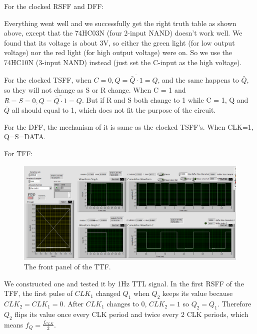 \documentclass[11pt]{article}
\begin{document}
For the clocked RSFF and DFF:

Everything went well and we successfully get the right truth table as shown above, except that the 74HC03N (four 2-input NAND) doesn't work well. We found that its voltage is about 3V, so either the green light (for low output voltage) nor the red light (for high output voltage) were on. So we use the 74HC10N (3-input NAND) instead (just set the C-input as the high voltage).

\vbox{}

For the clocked TSFF, when $C = 0, Q =\overline{\bar{Q}\cdot 1} = Q$, and the same happens to $\bar{Q}$, so they will not change as S or R change. When C = 1 and $R = S = 0, Q = \overline{\bar{Q}\cdot1} = Q$. But if R and S both change to 1 while C = 1, Q and $\bar{Q}$ all should equal to 1, which does not fit the purpose of the circuit.

\vbox{}

For the DFF, the mechanism of it is same as the clocked TSFF's. When CLK=1, Q=S=DATA.

\vbox{}

For TFF:


\begin{figure}[H]
 \begin{center}
  \includegraphics[width=\linewidth/1]{act4_3}
  \caption{The front panel of the TTF.}
  \label{fig:act4_3}
 \end{center}
\end{figure}

We constructed one and tested it by 1Hz TTL signal. In the first RSFF of the TFF, the first pulse of $CLK_{1}$ changed $Q_{1}$ when $Q_{2}$ keeps its value because $CLK_{2} = CLK_{1} = 0$. After $CLK_{1}$ changes to 0, $CLK_{2} = 1$ so $Q_{2} = Q_{1}$. Therefore $Q_{2}$ flips its value once every CLK period and twice every 2 CLK periods, which means $f_{Q} = \frac{f_{CLK}}{2}$.
\end{document}
